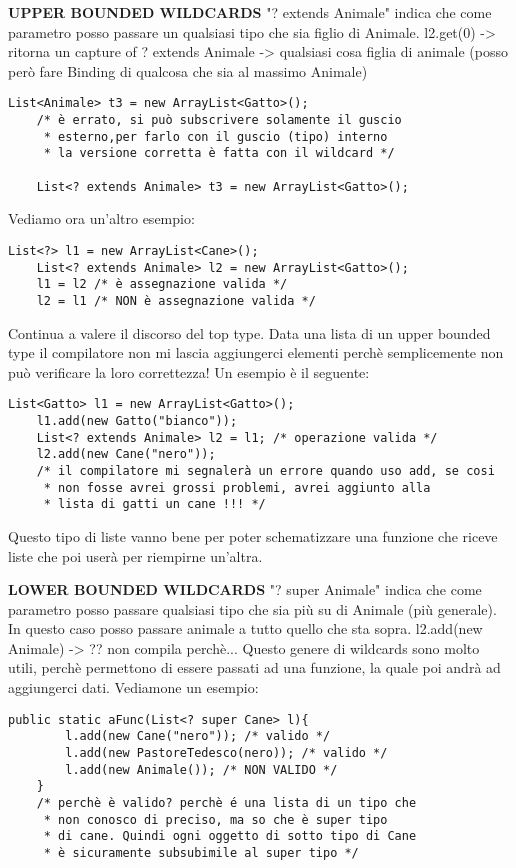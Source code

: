 \noindent \textbf{UPPER BOUNDED WILDCARDS} \newline
"? extends Animale" indica che come parametro posso passare un qualsiasi tipo che sia figlio di Animale. \newline
l2.get(0) -> ritorna un capture of ? extends Animale -> qualsiasi cosa figlia di animale (posso però fare Binding di qualcosa che sia al massimo Animale) \newline
\begin{lstlisting}[basicstyle=\small,]
	List<Animale> t3 = new ArrayList<Gatto>();
	/* è errato, si può subscrivere solamente il guscio
	 * esterno,per farlo con il guscio (tipo) interno
	 * la versione corretta è fatta con il wildcard */
	
	List<? extends Animale> t3 = new ArrayList<Gatto>();
\end{lstlisting}
Vediamo ora un'altro esempio:
\begin{lstlisting}[basicstyle=\small,]
	List<?> l1 = new ArrayList<Cane>();
	List<? extends Animale> l2 = new ArrayList<Gatto>();
	l1 = l2 /* è assegnazione valida */
	l2 = l1 /* NON è assegnazione valida */
\end{lstlisting}
\noindent Continua a valere il discorso del top type. Data una lista di un upper bounded type il compilatore non mi lascia aggiungerci elementi perchè semplicemente non può verificare la loro correttezza! Un esempio è il seguente:
\begin{lstlisting}[basicstyle=\small,]
	List<Gatto> l1 = new ArrayList<Gatto>();
	l1.add(new Gatto("bianco"));
	List<? extends Animale> l2 = l1; /* operazione valida */
	l2.add(new Cane("nero"));
	/* il compilatore mi segnalerà un errore quando uso add, se cosi
	 * non fosse avrei grossi problemi, avrei aggiunto alla
	 * lista di gatti un cane !!! */
\end{lstlisting}
\noindent Questo tipo di liste vanno bene per poter schematizzare una funzione che riceve liste che poi userà per riempirne un'altra.

\noindent \textbf{LOWER BOUNDED WILDCARDS} \newline
"? super Animale" indica che come parametro posso passare qualsiasi tipo che sia più su di Animale (più generale).\newline
In questo caso posso passare animale a tutto quello che sta sopra. \newline
l2.add(new Animale) -> ?? non compila perchè... \newline
Questo genere di wildcards sono molto utili, perchè permettono di essere passati ad una funzione, la quale poi andrà ad aggiungerci dati. Vediamone un esempio:
\begin{lstlisting}[basicstyle=\small,]
	public static aFunc(List<? super Cane> l){
		l.add(new Cane("nero")); /* valido */
		l.add(new PastoreTedesco(nero)); /* valido */
		l.add(new Animale()); /* NON VALIDO */
	}
	/* perchè è valido? perchè é una lista di un tipo che
	 * non conosco di preciso, ma so che è super tipo 
	 * di cane. Quindi ogni oggetto di sotto tipo di Cane
	 * è sicuramente subsubimile al super tipo */
\end{lstlisting}


